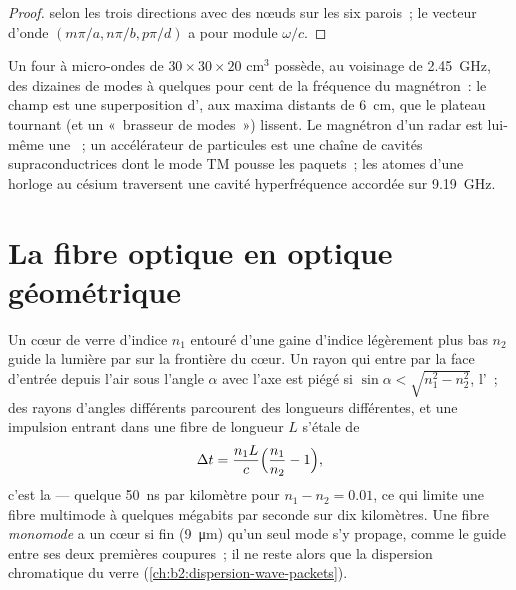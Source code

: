 \begin{proof}
 selon les trois directions avec des nœuds sur les six parois~;
le vecteur d'onde $(m\pi/a, n\pi/b, p\pi/d)$ a pour module $\omega/c$.
\end{proof}

\begin{example}\label{ex:b2:guided-waves:cavities}
Un four à micro-ondes de $30 \times 30 \times 20$ cm$^3$ possède, au voisinage de \qty{2.45}{GHz},
des dizaines de modes à quelques pour cent de la fréquence du magnétron~:
le champ est une superposition d', aux maxima distants de
\qty{6}{cm}, que le plateau tournant (et un «~brasseur de modes~») lissent.
Le magnétron d'un radar est lui-même une ~; un accélérateur
de particules est une chaîne de cavités supraconductrices dont le mode TM
pousse les paquets~; les atomes d'une horloge au césium traversent une cavité
hyperfréquence accordée sur \qty{9.19}{GHz}.
\end{example}

\section{La fibre optique en optique géométrique}

\begin{proposition}\label{prop:b2:guided-waves:fibre}
Un cœur de verre d'indice $n_1$ entouré d'une gaine d'indice légèrement plus
bas $n_2$ guide la lumière par  sur la frontière du
cœur. Un rayon qui entre par la face d'entrée depuis l'air sous l'angle $\alpha$ avec
l'axe est piégé si $\sin\alpha < \sqrt{n_1^2 - n_2^2}$, l'\emph{}~; des rayons d'angles différents parcourent des longueurs différentes, et une
impulsion entrant dans une fibre de longueur $L$ s'étale de
\[
\Delta t = \frac{n_1L}c\Bigl(\frac{n_1}{n_2} - 1\Bigr) ,
\]
c'est la \emph{} --- quelque \qty{50}{ns} par kilomètre pour $n_1
- n_2 = 0.01$, ce qui limite une fibre multimode à quelques mégabits par
seconde sur dix kilomètres. Une fibre \emph{monomode} a un cœur si
fin (\qty{9}{\micro m}) qu'un seul mode s'y propage, comme le guide
entre ses deux premières coupures~; il ne reste alors que la dispersion
chromatique du verre (\cref{ch:b2:dispersion-wave-packets}).
\end{proposition}

